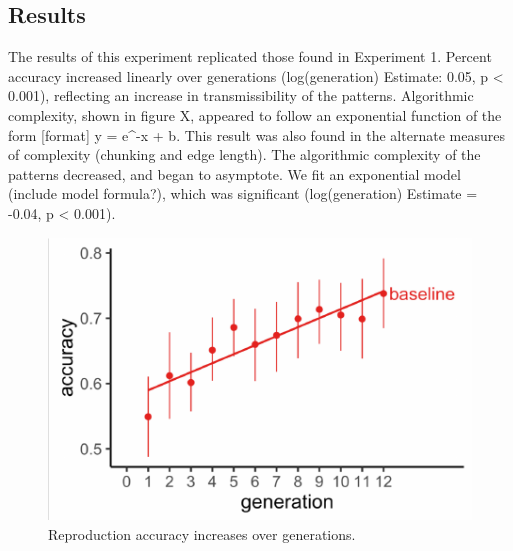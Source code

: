 \documentclass[10pt, letterpaper]{article}
\newenvironment{CodeChunk}{}{}
\begin{document}
\hypertarget{results-1}{%
\subsection{Results}\label{results-1}}

The results of this experiment replicated those found in Experiment 1.
Percent accuracy increased linearly over generations (log(generation)
Estimate: 0.05, p \textless{} 0.001), reflecting an increase in
transmissibility of the patterns. Algorithmic complexity, shown in
figure X, appeared to follow an exponential function of the form
{[}format{]} y = e\^{}-x + b. This result was also found in the
alternate measures of complexity (chunking and edge length). The
algorithmic complexity of the patterns decreased, and began to
asymptote. We fit an exponential model (include model formula?), which
was significant (log(generation) Estimate = -0.04, p \textless{} 0.001).

\begin{CodeChunk}
\begin{figure}[tb]

{\centering \includegraphics{figs/baseline_accuracy-1} 

}

\caption[Reproduction accuracy increases over generations]{Reproduction accuracy increases over generations.}\label{fig:baseline_accuracy}
\end{figure}
\end{CodeChunk}
\end{document}

